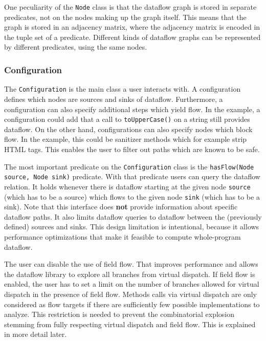 One peculiarity of the \texttt{Node} class is that the dataflow graph
is stored in separate predicates, not on the nodes making up the graph itself.
This means that the graph is stored in an adjacency matrix, where the
 adjacency matrix is encoded in the tuple set of a predicate.
Different kinds of dataflow graphs can be represented by different predicates,
using the same nodes.

\subsubsection*{Configuration}
The \texttt{Configuration} is the main class a user interacts with.
A configuration defines which nodes are sources and sinks of dataflow.
Furthermore, a configuration can also specify additional steps which yield flow.
In the example, a configuration could add that a call to 
\texttt{toUpperCase()} on a string still provides dataflow.
On the other hand, configurations can also specify nodes which block flow.
In the example, this could be sanitizer methods which for example strip HTML tags.
This enables the user to filter out paths which are known to be safe.

The most important predicate on the \texttt{Configuration} class 
is the \texttt{hasFlow(Node source, Node sink)} predicate.
With that predicate users can query the dataflow relation.
It holds whenever there is dataflow starting at the given node \texttt{source} 
(which has to be a source) which flows to the given node \texttt{sink} (which has to be a sink).
Note that this interface does \textbf{not} provide information about specific
dataflow paths.
It also limits dataflow queries to dataflow between the (previously defined) sources and sinks.
This design limitation is intentional, because it allows performance optimizations
that make it feasible to compute whole-program dataflow.

The user can disable the use of field flow.
That improves performance and allows the dataflow library to explore all branches
from virtual dispatch.
If field flow is enabled, the user has to set a limit on the number of branches 
allowed for virtual dispatch in the presence of field flow.
Methods calls via virtual dispatch are only considered as flow targets if there are 
sufficiently few possible implementations to analyze.
This restriction is needed to prevent the combinatorial explosion stemming from
fully respecting virtual dispatch and field flow.
This is explained in more detail later.

